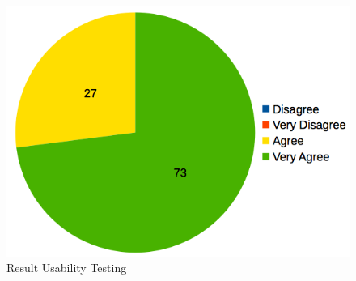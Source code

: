 \documentclass[conference, letterpaper]{IEEEtran}
\begin{document}
\begin{figure}[!t]
\centering
\includegraphics[scale=0.4]{image/usability.png}
\caption{Result Usability Testing}
\end{figure}


%
%

\end{document}
